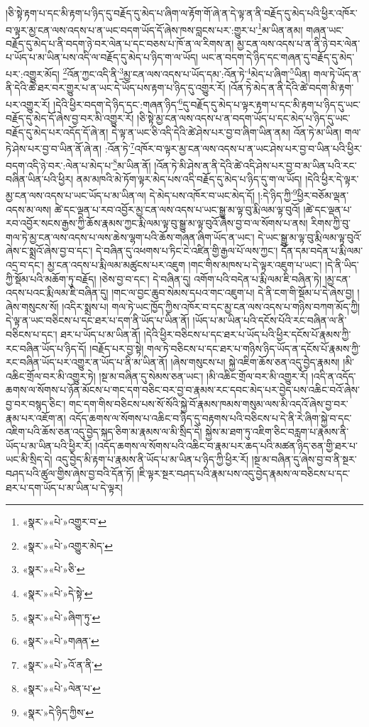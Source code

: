 །ཅི་སྟེ་རྟག་པ་དང་མི་རྟག་པ་ཉིད་དུ་བརྗོད་དུ་མེད་པ་ཞིག་ལ་རྟོག་གོ་ཞེ་ན་དེ་ལྟ་ན་ནི་བརྗོད་དུ་མེད་པའི་ཕྱིར་འཁོར་བ་ལྟར་མྱ་ངན་ལས་འདས་པ་ན་ཡང་བདག་ཡོད་དོ་ཞེས་ཁས་བླངས་པར་:གྱུར་པ་\footnote{«སྣར་»«པེ་»འགྱུར་བ་}མ་ཡིན་ནམ། གཞན་ཡང་བརྗོད་དུ་མེད་པ་ནི་བདག་ཉེ་བར་ལེན་པ་དང་བཅས་པ་ཁོ་ན་ལ་རིགས་ན། མྱ་ངན་ལས་འདས་པ་ན་ནི་ཉེ་བར་ལེན་པ་ཡོད་པ་མ་ཡིན་པས་འདི་ལ་བརྗོད་དུ་མེད་པ་ཉིད་ག་ལ་ཡོད། ཡང་ན་བདག་དེ་ཉིད་དང་གཞན་དུ་བརྗོད་དུ་མེད་པར་:འགྱུར་མོད། \footnote{«སྣར་»«པེ་»འགྱུར་མེད་}འོན་ཀྱང་འདི་ནི་\footnote{«སྣར་»«པེ་»ཅི་}མྱ་ངན་ལས་འདས་པ་ཡོད་དམ་:འོན་ཏེ་\footnote{«སྣར་»«པེ་»དེ་སྟེ་}མེད་པ་ཞིག་\footnote{«སྣར་»«པེ་»ཞིག་ཏུ་}ཡིན། གལ་ཏེ་ཡོད་ན་ནི་དེའི་ཚེ་ཐར་བར་གྱུར་པ་ན་ཡང་དེ་ཡོད་པས་རྟག་པ་ཉིད་དུ་འགྱུར་རོ། །འོན་ཏེ་མེད་ན་ནི་དེའི་ཚེ་བདག་མི་རྟག་པར་འགྱུར་རོ། །དེའི་ཕྱིར་བདག་དེ་ཉིད་དང་:གཞན་ཉིད་\footnote{«སྣར་»«པེ་»གཞན་}དུ་བརྗོད་དུ་མེད་པ་ལྟར་རྟག་པ་དང་མི་རྟག་པ་ཉིད་དུ་ཡང་བརྗོད་དུ་མེད་དོ་ཞེས་བྱ་བར་མི་འགྱུར་རོ། །ཅི་སྟེ་མྱ་ངན་ལས་འདས་པ་ན་བདག་ཡོད་པ་དང་མེད་པ་ཉིད་དུ་ཡང་བརྗོད་དུ་མེད་པར་འདོད་དོ་ཞེ་ན། དེ་ལྟ་ན་ཡང་ཅི་འདི་དེའི་ཚེ་ཤེས་པར་བྱ་བ་ཞིག་ཡིན་ནམ། འོན་ཏེ་མ་ཡིན། གལ་ཏེ་ཤེས་པར་བྱ་བ་ཡིན་ནོ་ཞེ་ན། :འོན་ཏེ་\footnote{«སྣར་»«པེ་»འོ་ན་ནི་}འཁོར་བ་ལྟར་མྱ་ངན་ལས་འདས་པ་ན་ཡང་ཤེས་པར་བྱ་བ་ཡིན་པའི་ཕྱིར་བདག་འདི་ཉེ་བར་:ལེན་པ་མེད་པ་\footnote{«སྣར་»«པེ་»ལེན་པ་}མ་ཡིན་ནོ། །འོན་ཏེ་མི་ཤེས་ན་ནི་དེའི་ཚེ་འདི་ཤེས་པར་བྱ་བ་མ་ཡིན་པའི་རང་བཞིན་ཡིན་པའི་ཕྱིར། ནམ་མཁའི་མེ་ཏོག་ལྟར་མེད་པས་འདི་བརྗོད་དུ་མེད་པ་ཉིད་དུ་ག་ལ་ཡོད། །དེའི་ཕྱིར་དེ་ལྟར་མྱ་ངན་ལས་འདས་པ་ཡང་ཡོད་པ་མ་ཡིན་ལ། དེ་མེད་པས་འཁོར་བ་ཡང་མེད་དོ། །:དེ་ཉིད་ཀྱི་\footnote{«སྣར་»དེ་ཉིད་ཀྱིས་}ཕྱིར་བཅོམ་ལྡན་འདས་མ་ལས། ཚེ་དང་ལྡན་པ་རབ་འབྱོར་མྱ་ངན་ལས་འདས་པ་ཡང་སྒྱུ་མ་ལྟ་བུ་རྨི་ལམ་ལྟ་བུའོ། །ཚེ་དང་ལྡན་པ་རབ་འབྱོར་སངས་རྒྱས་ཀྱི་ཆོས་རྣམས་ཀྱང་རྨི་ལམ་ལྟ་བུ་སྒྱུ་མ་ལྟ་བུའོ་ཞེས་བྱ་བ་ལ་སོགས་པ་ནས། རིགས་ཀྱི་བུ་གལ་ཏེ་མྱ་ངན་ལས་འདས་པ་ལས་ཆེས་ལྷག་པའི་ཆོས་གཞན་ཞིག་ཡོད་ན་ཡང་། དེ་ཡང་སྒྱུ་མ་ལྟ་བུ་རྨི་ལམ་ལྟ་བུའོ་ཞེས་ང་སྨྲའོ་ཞེས་བྱ་བ་དང་། དེ་བཞིན་དུ་འཕགས་པ་ཏིང་ངེ་འཛིན་གྱི་རྒྱལ་པོ་ལས་ཀྱང་། དོན་དམ་བདེན་པ་རྨི་ལམ་འདྲ་བ་དང་། མྱ་ངན་འདས་པ་རྨི་ལམ་མཚུངས་པར་འཇུག །གང་གིས་མཁས་པ་དེ་ལྟར་འཇུག་པ་ཡང་། །དེ་ནི་ཡིད་ཀྱི་སྡོམ་པའི་མཆོག་ཏུ་བརྗོད། །ཅེས་བྱ་བ་དང་། དེ་བཞིན་དུ། འགོག་པའི་བདེན་པ་རྨི་ལམ་ཇི་བཞིན་ཏེ། །མྱ་ངན་འདས་པའང་རྨི་ལམ་ཇི་བཞིན་དུ། །གང་ལ་བྱང་ཆུབ་སེམས་དཔའ་གང་འཇུག་པ། དེ་ནི་ངག་གི་སྡོམ་པ་དེ་ཞེས་བྱ། །ཞེས་གསུངས་སོ། །འདིར་སྨྲས་པ། གལ་ཏེ་ཡང་ཁྱོད་ཀྱིས་འཁོར་བ་དང་མྱ་ངན་ལས་འདས་པ་གཉིས་བཀག་མོད་ཀྱི། དེ་ལྟ་ན་ཡང་བཅིངས་པ་དང་ཐར་པ་དག་ནི་ཡོད་པ་ཡིན་ནོ། །ཡོད་པ་མ་ཡིན་པའི་དངོས་པོའི་རང་བཞིན་ལ་ནི་བཅིངས་པ་དང་། ཐར་པ་ཡོད་པ་མ་ཡིན་ནོ། །དེའི་ཕྱིར་བཅིངས་པ་དང་ཐར་པ་ཡོད་པའི་ཕྱིར་དངོས་པོ་རྣམས་ཀྱི་རང་བཞིན་ཡོད་པ་ཉིད་དོ། །བརྗོད་པར་བྱ་སྟེ། གལ་ཏེ་བཅིངས་པ་དང་ཐར་པ་གཉིས་ཉིད་ཡོད་ན་དངོས་པོ་རྣམས་ཀྱི་རང་བཞིན་ཡོད་པར་འགྱུར་ན་ཡོད་པ་ནི་མ་ཡིན་ནོ། །ཞེས་གསུངས་པ། སྐྱེ་འཇིག་ཆོས་ཅན་འདུ་བྱེད་རྣམས། །མི་འཆིང་གྲོལ་བར་མི་འགྱུར་ཏེ། །སྔ་མ་བཞིན་དུ་སེམས་ཅན་ཡང་། །མི་འཆིང་གྲོལ་བར་མི་འགྱུར་རོ། །འདི་ན་འདོད་ཆགས་ལ་སོགས་པ་ཉོན་མོངས་པ་གང་དག་བཅིང་བར་བྱ་བ་རྣམས་རང་དབང་མེད་པར་བྱེད་པས་འཆིང་བའོ་ཞེས་བྱ་བར་བསྙད་ཅིང་། གང་དག་གིས་བཅིངས་པས་སོ་སོའི་སྐྱེ་བོ་རྣམས་ཁམས་གསུམ་ལས་མི་འདའོ་ཞེས་བྱ་བར་རྣམ་པར་འཇོག་ན། འདོད་ཆགས་ལ་སོགས་པ་འཆིང་བ་ཉིད་དུ་བརྟགས་པའི་བཅིངས་པ་དེ་ནི་རེ་ཞིག་སྐྱེ་བ་དང་འཇིག་པའི་ཆོས་ཅན་འདུ་བྱེད་སྐད་ཅིག་མ་རྣམས་ལ་མི་སྲིད་དེ། སྐྱེས་མ་ཐག་ཏུ་འཇིག་ཅིང་བརླག་པ་རྣམས་ནི་ཡོད་པ་མ་ཡིན་པའི་ཕྱིར་རོ། །འདོད་ཆགས་ལ་སོགས་པའི་འཆིང་བ་རྣམ་པར་ཆད་པའི་མཚན་ཉིད་ཅན་གྱི་ཐར་པ་ཡང་མི་སྲིད་དེ། འདུ་བྱེད་མི་རྟག་པ་རྣམས་ནི་ཡོད་པ་མ་ཡིན་པ་ཉིད་ཀྱི་ཕྱིར་རོ། །སྔ་མ་བཞིན་དུ་ཞེས་བྱ་བ་ནི་སྔར་བཤད་པའི་ཚུལ་གྱིས་ཞེས་བྱ་བའི་དོན་ཏོ། །ཇི་ལྟར་སྔར་བཤད་པའི་རྣམ་པས་འདུ་བྱེད་རྣམས་ལ་བཅིངས་པ་དང་ཐར་པ་དག་ཡོད་པ་མ་ཡིན་པ་དེ་ལྟར། 